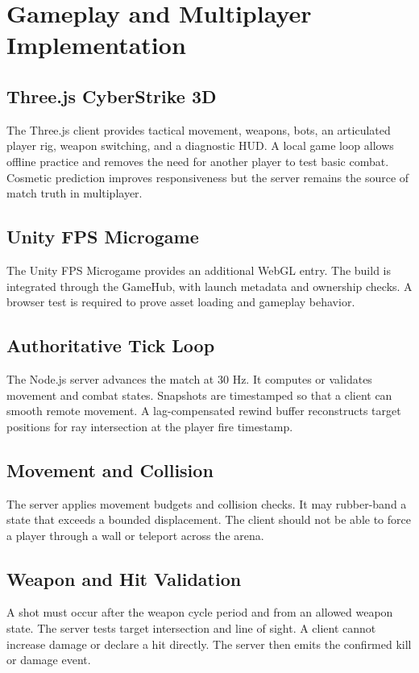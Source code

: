 \documentclass[12pt,a4paper,oneside]{report}
\begin{document}
\chapter{Gameplay and Multiplayer Implementation}
\section{Three.js CyberStrike 3D}
The Three.js client provides tactical movement, weapons, bots, an articulated player rig, weapon switching, and a diagnostic HUD. A local game loop allows offline practice and removes the need for another player to test basic combat. Cosmetic prediction improves responsiveness but the server remains the source of match truth in multiplayer.

\section{Unity FPS Microgame}
The Unity FPS Microgame provides an additional WebGL entry. The build is integrated through the GameHub, with launch metadata and ownership checks. A browser test is required to prove asset loading and gameplay behavior.

\section{Authoritative Tick Loop}
The Node.js server advances the match at 30 Hz. It computes or validates movement and combat states. Snapshots are timestamped so that a client can smooth remote movement. A lag-compensated rewind buffer reconstructs target positions for ray intersection at the player fire timestamp.

\section{Movement and Collision}
The server applies movement budgets and collision checks. It may rubber-band a state that exceeds a bounded displacement. The client should not be able to force a player through a wall or teleport across the arena.

\section{Weapon and Hit Validation}
A shot must occur after the weapon cycle period and from an allowed weapon state. The server tests target intersection and line of sight. A client cannot increase damage or declare a hit directly. The server then emits the confirmed kill or damage event.
\end{document}
